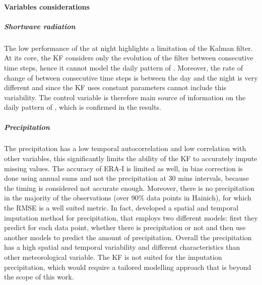 \documentclass{article}
\begin{document}


\paragraph{Variables considerations}

\subparagraph{Shortwave radiation} The low performance of the  at night highlights a limitation of the Kalman filter.  At its core, the KF considers only the evolution of the filter between consecutive time steps, hence it cannot model the daily pattern of . Moreover, the rate of change of  between consecutive time steps is between the day and the night is very different and since the KF uses constant parameters cannot include this variability. The control variable is therefore main source of information on the daily pattern of , which is confirmed in the results.

\subparagraph{Precipitation} The precipitation has a low temporal autocorrelation and low correlation with other variables, this significantly limits the ability of the KF to accurately impute missing values. The accuracy of ERA-I is limited as well, in  bias correction is done using annual sums and not the precipitation at 30 mins intervals, because the timing is considered not accurate enough. Moreover, there is no precipitation in the majority of the observations (over 90\% data points in Hainich), for which the RMSE is a well suited metric. In fact, \cite{chivers_imputation_2020} developed a spatial and temporal imputation method for precipitation, that employs two different models: first they predict for each data point, whether there is precipitation or not and then use another models to predict the amount of precipitation.  Overall the precipitation has a high spatial and temporal variability \cite{mital_sequential_2020} and different characteristics  than other meteorological variable. The KF is not suited for the imputation precipitation, which would require a tailored modelling approach that is beyond the scope of this work.
\end{document}
